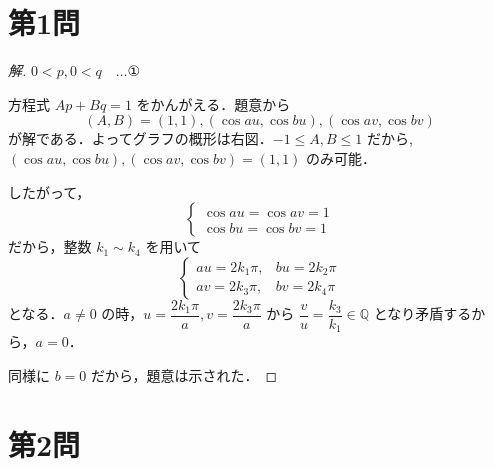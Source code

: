 \documentclass[../main.tex]{subfiles}
\begin{document}
\section*{第1問}

\begin{proof}[解]
  $0 < p, 0 < q \quad \dots \text{①}$

  方程式 $Ap + Bq = 1$ をかんがえる．題意から
  \[
    (A, B) = (1, 1), (\cos au, \cos bu), (\cos av, \cos bv)
  \]
  が解である．よってグラフの概形は右図．$-1 \le A, B \le 1$
  だから, $(\cos au, \cos bu), (\cos av, \cos bv) = (1, 1)$ のみ可能．

  \begin{center}
  \end{center}

  したがって，
  \[
    \begin{cases}
      \cos au = \cos av = 1 \\
      \cos bu = \cos bv = 1
    \end{cases}
  \]
  だから，整数 $k_1 \sim k_4$ を用いて
  \[
    \begin{cases}
      au = 2k_1 \pi, & bu = 2k_2 \pi \\
      av = 2k_3 \pi, & bv = 2k_4 \pi
    \end{cases}
  \]
  となる．$a \neq 0$ の時，$u = \dfrac{2k_1 \pi}{a}, v = \dfrac{2k_3 \pi}{a}$ から $\dfrac{v}{u} = \dfrac{k_3}{k_1} \in \mathbb{Q}$ となり矛盾するから，$a = 0$．

  同様に $b = 0$ だから，題意は示された．
\end{proof}

\newpage

\section*{第2問}
\end{document}
